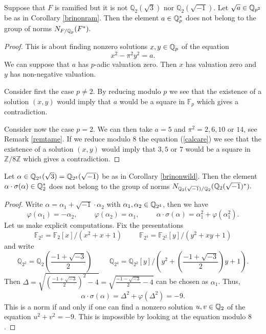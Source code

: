 \documentclass[11pt]{amsart}
\begin{document}
\begin{lemma}\label{notnormram}
Suppose that $F$ is ramified but it is not $\mathbb{Q}_2(\sqrt{3})$ nor  $\mathbb{Q}_2(\sqrt{-1})$. Let $\sqrt{a}\in \mathbb{Q}_{p^2}$ be as in Corollary \ref{brinonram}. Then the element $a \in \mathbb{Q}_p^*$ does not belong to the group of norms $ N_{F/\mathbb{Q}_p}(F^*).$
\end{lemma}
\begin{proof}
This is about finding nonzero solutions $ x,y \in \mathbb{Q}_p$ of the equation
\begin{equation}\label{calcare} x^2 -\pi^2 y ^2 = a. \end{equation}
We can suppose that    $a$ has $p$-adic valuation zero. Then $x$ has valuation zero and $y$ has non-negative valuation. 

Consider first the case $p\neq 2$. By reducing modulo $p$ we see that the existence of a solution $(x,y)$ would imply that $a$ would be a square in $\mathbb{F}_p$  which gives a contradiction. 

Consider now the case $p= 2$. We can then take $a=5$ and $\pi^2=2,6,10$ or $14$, see Remark \ref{remtame}. If we reduce modulo $8$ the  equation (\ref{calcare}) we see that the existence of a solution $(x,y)$ would imply that  $3,5$ or $7$ would be a square in $\mathbb{Z}/ 8 \mathbb{Z}$ which gives a contradiction. 
\end{proof}





\begin{lemma}\label{notnormwild}
Let $\alpha \in \mathbb{Q}_{2^4}(\sqrt{3})=\mathbb{Q}_{2^4}(\sqrt{-1})$ be as in Corollary \ref{brinonwild}. Then the element $\alpha  \cdot \sigma(\alpha) \in \mathbb{Q}_2^*$ does not belong to the group of norms $ N_{\mathbb{Q}_2(\sqrt{-1})/\mathbb{Q}_2}(\mathbb{Q}_2(\sqrt{-1})^*).$
\end{lemma}
\begin{proof}
 Write $\alpha= \alpha_1+\sqrt{-1}\cdot\alpha_2$ with $\alpha_1,\alpha_2 \in \mathbb{Q}_{2^4}$, then we have
 \[\varphi(\alpha_1)=-\alpha_2,  \hspace{1cm} \varphi(\alpha_2)=\alpha_1, \hspace{1cm} \alpha  \cdot \sigma(\alpha)=\alpha_1^2+\varphi(\alpha_1^2).\]
 Let us make explicit computations. Fix the presentations
\[\mathbb{F}_{2^2}=\mathbb{F}_{2}[x]/(x^2+x+1) \hspace{1cm} \mathbb{F}_{2^4}=\mathbb{F}_{2^2}[y]/(y^2+xy+1)\]
and write
\[\mathbb{Q}_{2^2}=\mathbb{Q}_{2}(\frac{-1+\sqrt{-3}}{2}) \hspace{1cm} \mathbb{Q}_{2^4}=\mathbb{Q}_{2^2}[y]/(y^2+(\frac{-1+\sqrt{-3}}{2})y+1).\]
Then $\Delta=\sqrt{(\frac{-1+\sqrt{-3}}{2})^2-4}=\sqrt{\frac{-1-\sqrt{-3}}{2}-4}$ can be chosen as $\alpha_1$. Thus, 
\[\alpha  \cdot \sigma(\alpha)=\Delta^2 + \varphi(\Delta^2)= -9.\]
This is a norm if and only if one can find a nonzero solution $u,v \in \mathbb{Q}_2$ of the equation $u^2+v^2=-9$. This is impossible by looking at the equation modulo $8$.
\end{proof}
\end{document}
